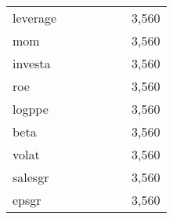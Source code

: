 \begin{table}[htbp]
\begin{tabular}{l*{1}{cccccc}}
leverage            &            &            &            &            &            &       3,560\\
mom                 &            &            &            &            &            &       3,560\\
investa             &            &            &            &            &            &       3,560\\
roe                 &            &            &            &            &            &       3,560\\
logppe              &            &            &            &            &            &       3,560\\
beta                &            &            &            &            &            &       3,560\\
volat               &            &            &            &            &            &       3,560\\
salesgr             &            &            &            &            &            &       3,560\\
epsgr               &            &            &            &            &            &       3,560\\
\bottomrule
\end{tabular}
\end{table}
